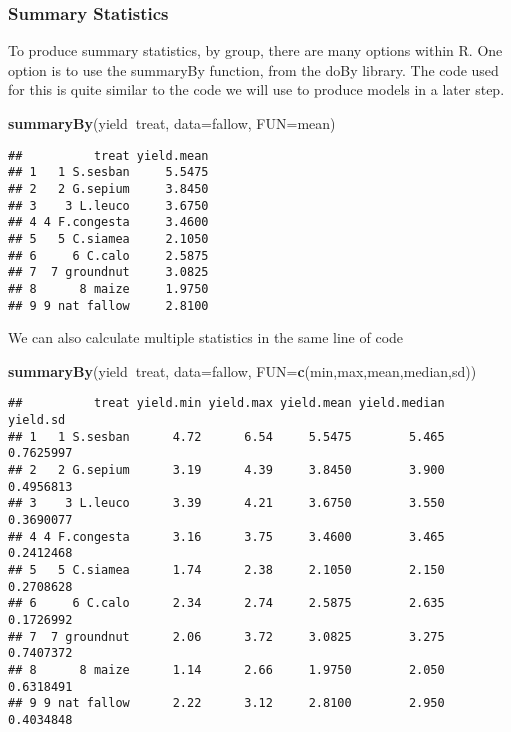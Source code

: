 \documentclass[]{book}
\newenvironment{Shaded}{\begin{snugshade}}{\end{snugshade}}
\newcommand{\KeywordTok}[1]{\textcolor[rgb]{0.13,0.29,0.53}{\textbf{#1}}}
\newcommand{\DataTypeTok}[1]{\textcolor[rgb]{0.13,0.29,0.53}{#1}}
\newcommand{\OperatorTok}[1]{\textcolor[rgb]{0.81,0.36,0.00}{\textbf{#1}}}
\newcommand{\NormalTok}[1]{#1}
\theoremstyle{definition}
\theoremstyle{definition}
\theoremstyle{definition}
\theoremstyle{remark}
\begin{document}
\subsubsection{Summary Statistics}\label{summary-statistics}

To produce summary statistics, by group, there are many options within
R. One option is to use the summaryBy function, from the doBy library.
The code used for this is quite similar to the code we will use to
produce models in a later step.

\begin{Shaded}
\begin{Highlighting}[]
\KeywordTok{summaryBy}\NormalTok{(yield}\OperatorTok{~}\NormalTok{treat, }\DataTypeTok{data=}\NormalTok{fallow, }\DataTypeTok{FUN=}\NormalTok{mean)}
\end{Highlighting}
\end{Shaded}

\begin{verbatim}
##          treat yield.mean
## 1   1 S.sesban     5.5475
## 2   2 G.sepium     3.8450
## 3    3 L.leuco     3.6750
## 4 4 F.congesta     3.4600
## 5   5 C.siamea     2.1050
## 6     6 C.calo     2.5875
## 7  7 groundnut     3.0825
## 8      8 maize     1.9750
## 9 9 nat fallow     2.8100
\end{verbatim}

We can also calculate multiple statistics in the same line of code

\begin{Shaded}
\begin{Highlighting}[]
\KeywordTok{summaryBy}\NormalTok{(yield}\OperatorTok{~}\NormalTok{treat, }\DataTypeTok{data=}\NormalTok{fallow, }\DataTypeTok{FUN=}\KeywordTok{c}\NormalTok{(min,max,mean,median,sd))}
\end{Highlighting}
\end{Shaded}

\begin{verbatim}
##          treat yield.min yield.max yield.mean yield.median  yield.sd
## 1   1 S.sesban      4.72      6.54     5.5475        5.465 0.7625997
## 2   2 G.sepium      3.19      4.39     3.8450        3.900 0.4956813
## 3    3 L.leuco      3.39      4.21     3.6750        3.550 0.3690077
## 4 4 F.congesta      3.16      3.75     3.4600        3.465 0.2412468
## 5   5 C.siamea      1.74      2.38     2.1050        2.150 0.2708628
## 6     6 C.calo      2.34      2.74     2.5875        2.635 0.1726992
## 7  7 groundnut      2.06      3.72     3.0825        3.275 0.7407372
## 8      8 maize      1.14      2.66     1.9750        2.050 0.6318491
## 9 9 nat fallow      2.22      3.12     2.8100        2.950 0.4034848
\end{verbatim}
\end{document}
